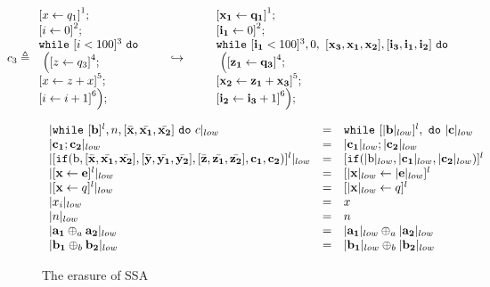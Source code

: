 \documentclass[a4paper,11pt]{article}
\begin{document}
{
\[
c_3 \triangleq
\begin{array}{l}
     \left[x \leftarrow q_1 \right]^1 ; \\
     \left[i \leftarrow 0 \right]^2 ; \\
    \ewhile ~  [i < 100]^3 ~ \edo
    \\
    ~ \Big( 
    \left[z \leftarrow q_3 \right]^4; \\
    \left[x \leftarrow z + x \right]^5; \\
    \left[i \leftarrow i + 1 \right]^6
    \Big) ;
\end{array}
%
\hspace{20pt} \hookrightarrow \hspace{20pt} 
%
\begin{array}{l}
     \left[\ssa{x_1} \leftarrow \ssa{q_1} \right]^1 ; \\
     \left[\ssa{i_1} \leftarrow 0 \right]^2 ; \\
    \ewhile
    ~ [\ssa{i_1} < 100]^3, 0,
    ~\ssa{[ x_3,x_1 ,x_2 ], [i_3, i_1, i_2] }~
    \edo \\
    ~ \Big( 
    \left[\ssa{z_1} \leftarrow \ssa{q_3} \right]^4; \\
    \left[ \ssa{x_2} \leftarrow \ssa{z_1 + x_3} \right]^5; \\
    \left[\ssa{i_2} \leftarrow \ssa{i_3} + 1 \right]^6
    \Big) ;
\end{array}
\]
}
%
\begin{figure}
   \[
 \begin{array}{lll}
    | 
    \mathtt{while} ~ [ \mathbf{{b}} ]^{l}, n, [\bar{\mathbf{{x}}}, \bar{\mathbf{{x_1}}}, \bar{\mathbf{{x_2}}}] ~ \mathtt{do} ~  c
    |_{low}  
    &=&  
    {\mathtt{while} ~ [|\mathbf{{b}}|_{low}]^{l},  ~ \mathtt{do} ~ |\mathbf{{c}}|_{low} 
    }\\
      |\mathbf{{c_1 ; c_2}}|_{low}  &=& |\mathbf{{c_1}}|_{low} ; |\mathbf{{c_2}}|_{low} \\
       |[\mathtt{if}(\textrm{b},[ \bar{\mathbf{{x}}}, \bar{\mathbf{{x_1}}}, \bar{\mathbf{{x_2}}}] ,[ \bar{\mathbf{{y}}}, \bar{\mathbf{{y_1}}}, \bar{\mathbf{{y_2}}}] , [ \bar{\mathbf{{z}}}, \bar{\mathbf{{z_1}}}, \bar{\mathbf{{z_2}}}] , \mathbf{{ c_1, c_2)}}]^{l}|_{low}  &=&
       [\mathtt{if}(|\textrm{b}|_{low}, |\mathbf{{ c_1}}|_{low}, |\mathbf{{c_2}}|_{low})]^{l}\\
       | [\mathrel{ \mathbf{{x}} \leftarrow \mathbf{{e}} }]^{l}|_{low} & = & [\mathrel{ |\mathbf{{x}}|_{low} \leftarrow |\mathbf{{e}}|_{low} } ]^{l}  \\
       | [\mathrel{ \mathbf{{x}} \leftarrow q } ]^{l} |_{low} & = & [\mathrel{ |\mathbf{{x}}|_{low} \leftarrow q }]^{l} \\
       |x_i|_{low} & = & x \\
       |n |_{low} & = & n \\
      | \mathbf{{a_1}} \oplus_{a} \mathbf{{a_2}} |_{low} & = &  |\mathbf{{a_1}}|_{low} \oplus_a |\mathbf{{a_2}}|_{low} \\
      | \mathbf{{b_1}} \oplus_{b} \mathbf{{b_2}} |_{low} & = &  |\mathbf{{b_1}}|_{low} \oplus_b |\mathbf{{b_2}}|_{low}
 \end{array}
\]
    \caption{The erasure of SSA}
    \label{fig:ssa_erasure-while}
\end{figure}
\end{document}
